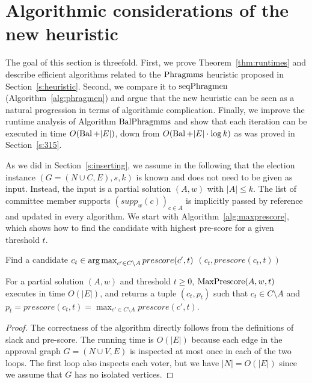 \section{Algorithmic considerations of the new heuristic}\label{s:algorithms}

The goal of this section is threefold. 
First, we prove Theorem~\ref{thm:runtimes} and describe efficient algorithms related to the $\operatorname{Phragmms}$ heuristic proposed in Section~\ref{s:heuristic}. 
Second, we compare it to $\operatorname{seqPhragmen}$ (Algorithm~\ref{alg:phragmen}) and argue that the new heuristic can be seen as a natural progression in terms of algorithmic complication. 
Finally, we improve the runtime analysis of Algorithm $\operatorname{BalPhragmms}$ and show that each iteration can be executed in time $O(\operatorname{Bal} + |E|)$, down from $O(\operatorname{Bal} + |E|\cdot \log k)$ as was proved in Section~\ref{s:315}. 

As we did in Section~\ref{s:inserting}, we assume in the following that the election instance $(G=(N\cup C, E), s, k)$ is known and does not need to be given as input. Instead, the input is a partial solution $(A,w)$ with $|A|\leq k$. The list of committee member supports $(supp_w(c))_{c\in A}$ is implicitly passed by reference and updated in every algorithm.
We start with Algorithm~\ref{alg:maxprescore}, which shows how to find the candidate with highest pre-score for a given threshold $t$.

\begin{algorithm}[htb]\label{alg:maxprescore}
\SetAlgoLined
{}
Find a candidate $c_t\in\operatorname*{arg\,max}_{c'\in C\setminus A} prescore(c', t)$\;
\Return $(c_t, prescore(c_t, t))$\;
 \caption{$\maxprescore(A,w,t)$}
\end{algorithm}

\begin{lemma}
For a partial solution $(A,w)$ and threshold $t\geq 0$, $\maxprescore(A,w,t)$ executes in time $O(|E|)$, 
and returns a tuple $(c_t,p_t)$ such that $c_t\in C\setminus A$ 
and $p_t=prescore(c_t,t)=\max_{c'\in C\setminus A} prescore(c',t)$.
\end{lemma}

\begin{proof}
The correctness of the algorithm directly follows from the definitions of slack and pre-score. The running time is $O(|E|)$ because each edge in the approval graph $G=(N\cup V, E)$ is inspected at most once in each of the two loops. The first loop also inspects each voter, but we have $|N|=O(|E|)$ since we assume that $G$ has no isolated vertices.
\end{proof}


